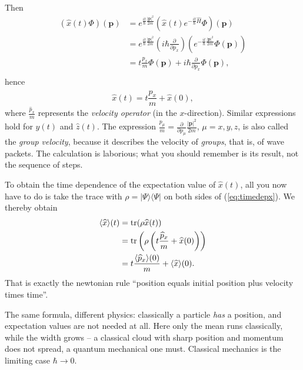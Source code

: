 Then
\begin{equation}\label{eq:timedepx}
	\begin{split}
		(\widehat{x}(t)\Phi)(\mathbf{p}) &= e^{\frac{it}{\hbar} \frac{|\mathbf{p}|^2}{2m}}\left(\widehat{x}(t)e^{-\frac{it}{\hbar}\widehat{H}}\Phi\right)(\mathbf{p}) \\
		&= e^{\frac{it}{\hbar} \frac{|\mathbf{p}|^2}{2m}}\left(i\hbar \frac{\partial}{\partial p_x}\right)\left(e^{-\frac{it}{\hbar}\frac{|\mathbf{p}|^2}{2m}}\Phi(\mathbf{p})\right) \\
		&= t \frac{p_x}{m}\Phi(\mathbf{p}) + i\hbar \frac{\partial}{\partial p_x} \Phi(\mathbf{p}), \\ 
	\end{split}
\end{equation}
hence
\begin{equation}
	\widehat{x}(t) = t \frac{\widehat{p}_x}{m} + \widehat{x}(0),
\end{equation}
where $\frac{\widehat{p}_x}{m}$ represents the \emph{velocity operator} (in the $x$-direction). Similar expressions hold for $\widehat{y}(t)$ and $\widehat{z}(t)$. The expression $\frac{p_\mu}{m} = \frac{\partial}{\partial p_\mu} \frac{|\mathbf{p}|^2}{2m}$, $\mu = x,y,z$, is also called the \emph{group velocity}, because it describes the velocity of \emph{groups}, that is, of wave packets. The calculation is laborious; what you should remember is its result, not the sequence of steps.

To obtain the time dependence of the expectation value of $\widehat{x}(t)$, all you now have to do is take the trace with $\rho =  |\Psi\rangle\langle\Psi|$ on both sides of (\ref{eq:timedepx}). We thereby obtain
\begin{equation}
	\begin{split}
		\langle\widehat{x}\rangle(t) &= \operatorname{tr}(\rho \widehat{x}(t)) \\
		&= \operatorname{tr}\left(\rho \left(t \frac{\widehat{p}_x}{m} + \widehat{x}(0)\right)\right)\\
		&= t \frac{\langle\widehat{p}_x \rangle(0)}{m} + \langle\widehat{x}\rangle(0).
	\end{split}
\end{equation}
That is exactly the newtonian rule ``position equals initial position plus velocity times time''.

\begin{intuition}
	The same formula, different physics: classically a particle \emph{has} a position, and expectation values are not needed at all. Here only the mean runs classically, while the width grows -- a classical cloud with sharp position and momentum does not spread, a quantum mechanical one must. Classical mechanics is the limiting case $\hbar\to 0$.
\end{intuition}

